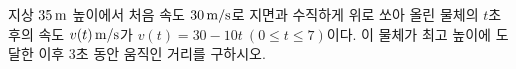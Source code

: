 지상 $35\mkern3mu \mathrm{m}$ 높이에서 처음 속도 $30\mkern3mu \mathrm{m/s}$로 지면과 수직하게 위로 쏘아 올린 물체의 $t$초 후의 속도 $v(t)\mkern3mu \mathrm{m/s}$가 $v(t)=30-10t\ (0\le t\le 7)$이다. 이 물체가 최고 높이에 도달한 이후 $3$초 동안 움직인 거리를 구하시오.
